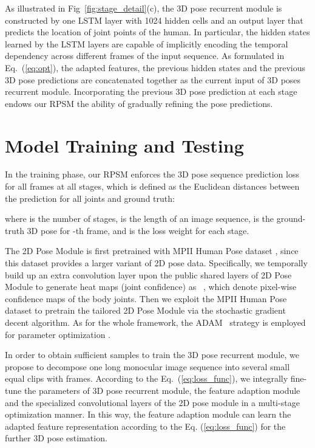 \documentclass[10pt,twocolumn,letterpaper]{article}
\begin{document}
As illustrated in Fig~\ref{fig:stage_detail}(c), the 3D pose recurrent module is constructed by one LSTM layer with 1024 hidden cells and an output layer that predicts the location of  joint points of the human. In particular, the hidden states learned by the LSTM layers are capable of implicitly encoding the temporal dependency across different frames of the input sequence. As formulated in Eq.~(\ref{eq:opt}), the adapted features, the previous hidden states and the previous 3D pose predictions are concatenated together as the current input of 3D poses recurrent module. Incorporating the previous 3D pose prediction at each stage endows our RPSM the ability of gradually refining the pose predictions. 


\section{Model Training and Testing}
In the training phase, our RPSM enforces the 3D pose sequence prediction loss for all frames at all stages, which is defined as the Euclidean distances between the prediction for all  joints and ground truth:

where  is the number of stages,  is the length of an image sequence,  is the ground-truth 3D pose for -th frame, and  is the loss weight for each stage. 

The 2D Pose Module is first pretrained with MPII Human Pose dataset \cite{andriluka14cvpr}, since this dataset provides a larger variant of 2D pose data. Specifically, we temporally build up an extra convolution layer upon the public shared layers of 2D Pose Module to generate heat maps (joint confidence) as ~\cite{jt14nips}, which denote pixel-wise confidence maps of the body joints. Then we exploit the MPII Human Pose dataset \cite{andriluka14cvpr} to pretrain the tailored 2D Pose Module via the stochastic gradient decent algorithm. As for the whole framework, the ADAM~\cite{Kingma2014Adam} strategy is employed for parameter optimization .

In order to obtain sufficient samples to train the 3D pose recurrent module, we propose to decompose one long monocular image sequence into several small equal clips with  frames. According to the Eq.~(\ref{eq:loss_func}), we integrally fine-tune the parameters of 3D pose recurrent module, the feature adaption module and the specialized convolutional layers of the 2D pose module in a multi-stage optimization manner. In this way, the feature adaption module can learn the adapted feature representation according to the Eq. (\ref{eq:loss_func}) for the further 3D pose estimation.
\end{document}
